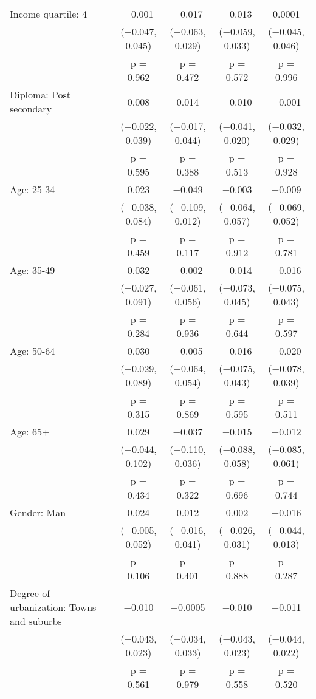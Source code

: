 \begin{tabular}{@{\extracolsep{5pt}}lcccc}
  Income quartile: 4 & $-$0.001 & $-$0.017 & $-$0.013 & 0.0001 \\ 
  & ($-$0.047, 0.045) & ($-$0.063, 0.029) & ($-$0.059, 0.033) & ($-$0.045, 0.046) \\ 
  & p = 0.962 & p = 0.472 & p = 0.572 & p = 0.996 \\ 
  Diploma: Post secondary & 0.008 & 0.014 & $-$0.010 & $-$0.001 \\ 
  & ($-$0.022, 0.039) & ($-$0.017, 0.044) & ($-$0.041, 0.020) & ($-$0.032, 0.029) \\ 
  & p = 0.595 & p = 0.388 & p = 0.513 & p = 0.928 \\ 
  Age: 25\mbox{-}34 & 0.023 & $-$0.049 & $-$0.003 & $-$0.009 \\ 
  & ($-$0.038, 0.084) & ($-$0.109, 0.012) & ($-$0.064, 0.057) & ($-$0.069, 0.052) \\ 
  & p = 0.459 & p = 0.117 & p = 0.912 & p = 0.781 \\ 
  Age: 35\mbox{-}49 & 0.032 & $-$0.002 & $-$0.014 & $-$0.016 \\ 
  & ($-$0.027, 0.091) & ($-$0.061, 0.056) & ($-$0.073, 0.045) & ($-$0.075, 0.043) \\ 
  & p = 0.284 & p = 0.936 & p = 0.644 & p = 0.597 \\ 
  Age: 50\mbox{-}64 & 0.030 & $-$0.005 & $-$0.016 & $-$0.020 \\ 
  & ($-$0.029, 0.089) & ($-$0.064, 0.054) & ($-$0.075, 0.043) & ($-$0.078, 0.039) \\ 
  & p = 0.315 & p = 0.869 & p = 0.595 & p = 0.511 \\ 
  Age: 65+ & 0.029 & $-$0.037 & $-$0.015 & $-$0.012 \\ 
  & ($-$0.044, 0.102) & ($-$0.110, 0.036) & ($-$0.088, 0.058) & ($-$0.085, 0.061) \\ 
  & p = 0.434 & p = 0.322 & p = 0.696 & p = 0.744 \\ 
  Gender: Man & 0.024 & 0.012 & 0.002 & $-$0.016 \\ 
  & ($-$0.005, 0.052) & ($-$0.016, 0.041) & ($-$0.026, 0.031) & ($-$0.044, 0.013) \\ 
  & p = 0.106 & p = 0.401 & p = 0.888 & p = 0.287 \\ 
  Degree of urbanization: Towns and suburbs & $-$0.010 & $-$0.0005 & $-$0.010 & $-$0.011 \\ 
  & ($-$0.043, 0.023) & ($-$0.034, 0.033) & ($-$0.043, 0.023) & ($-$0.044, 0.022) \\ 
  & p = 0.561 & p = 0.979 & p = 0.558 & p = 0.520 \\ 

\end{tabular}

